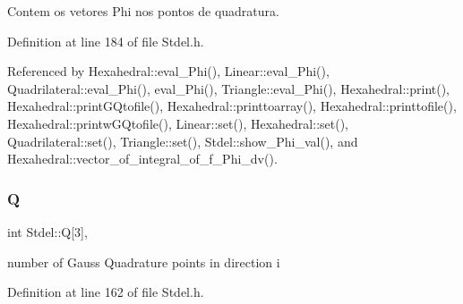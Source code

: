 Contem os vetores Phi nos pontos de quadratura. 



Definition at line 184 of file Stdel.\+h.



Referenced by Hexahedral\+::eval\+\_\+\+Phi(), Linear\+::eval\+\_\+\+Phi(), Quadrilateral\+::eval\+\_\+\+Phi(), eval\+\_\+\+Phi(), Triangle\+::eval\+\_\+\+Phi(), Hexahedral\+::print(), Hexahedral\+::print\+G\+Qtofile(), Hexahedral\+::printtoarray(), Hexahedral\+::printtofile(), Hexahedral\+::printw\+G\+Qtofile(), Linear\+::set(), Hexahedral\+::set(), Quadrilateral\+::set(), Triangle\+::set(), Stdel\+::show\+\_\+\+Phi\+\_\+val(), and Hexahedral\+::vector\+\_\+of\+\_\+integral\+\_\+of\+\_\+f\+\_\+\+Phi\+\_\+dv().

\mbox{\label{classStdel_a82074e598ad5af5ec45a3257a3c2b684}} 
\subsubsection{\texorpdfstring{Q}{Q}}
{\footnotesize\ttfamily int Stdel\+::Q\mbox{[}3\mbox{]}\hspace{0.3cm}{\ttfamily [protected]}, {\ttfamily [inherited]}}



number of Gauss Quadrature points in direction i 



Definition at line 162 of file Stdel.\+h.




